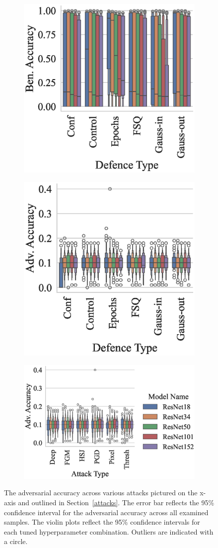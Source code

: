 \begin{figure}[!h]
\begin{subfigure}
    \centering
    \includegraphics[trim={0 5pt 0 10pt},clip,width=.27\textwidth]{mnist/ben_accuracy_vs_defence_type.eps}
\end{subfigure}
\begin{subfigure}
    \centering
    \includegraphics[trim={0 5pt 0 10pt},clip,width=.27\textwidth]{mnist/adv_accuracy_vs_defence_type.eps}
\end{subfigure}
\begin{subfigure}
    \centering
    \includegraphics[trim={0 5pt 0 10pt},clip,width=.4\textwidth]{mnist/adv_accuracy_vs_attack_type.eps}
\end{subfigure}
\caption{The adversarial accuracy across various attacks pictured on the x-axis and outlined in Section~\ref{attacks}. The error bar reflects the 95\% confidence interval for the adversarial accuracy across all examined samples. The violin plots reflect the 95\% confidence intervals for each tuned hyperparameter combination. Outliers are indicated with a circle.}
\label{fig:mnist_accuracies}
\end{figure}

